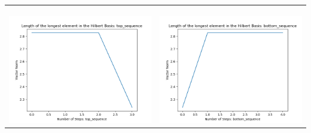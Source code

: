 \documentclass[10pt]{article}
\begin{document}
\begin{tabular}{c|c}
\begin{minipage}{.45\textwidth}
\end{minipage} \\ \\
\hline \\\begin{minipage}{.45\textwidth}
\includegraphics[width=\textwidth]{"DATA/5d/5 generators 1 bound D/top_sequence LENGTH"}
\end{minipage} &
\begin{minipage}{.45\textwidth}
\includegraphics[width=\textwidth]{"DATA/5d/5 generators 1 bound D bottomup/bottom_sequence LENGTH"}
\end{minipage}
\end{tabular}
\end{document}
